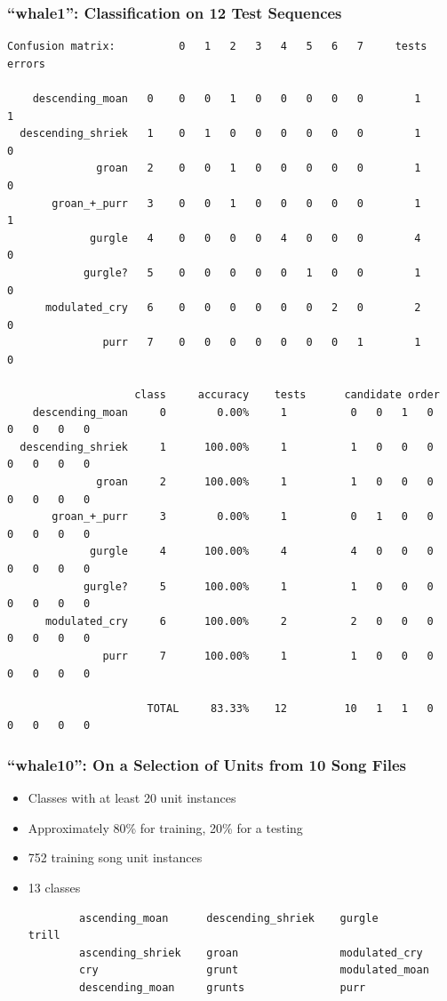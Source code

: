 \documentclass{beamer}
\begin{document}
\begin{frame}[fragile]
    \frametitle{``whale1'': Classification on 12 Test Sequences}

    \tiny{
    \begin{verbatim}
Confusion matrix:          0   1   2   3   4   5   6   7     tests   errors

    descending_moan   0    0   0   1   0   0   0   0   0        1       1
  descending_shriek   1    0   1   0   0   0   0   0   0        1       0
              groan   2    0   0   1   0   0   0   0   0        1       0
       groan_+_purr   3    0   0   1   0   0   0   0   0        1       1
             gurgle   4    0   0   0   0   4   0   0   0        4       0
            gurgle?   5    0   0   0   0   0   1   0   0        1       0
      modulated_cry   6    0   0   0   0   0   0   2   0        2       0
               purr   7    0   0   0   0   0   0   0   1        1       0

                    class     accuracy    tests      candidate order
    descending_moan     0        0.00%     1          0   0   1   0   0   0   0   0
  descending_shriek     1      100.00%     1          1   0   0   0   0   0   0   0
              groan     2      100.00%     1          1   0   0   0   0   0   0   0
       groan_+_purr     3        0.00%     1          0   1   0   0   0   0   0   0
             gurgle     4      100.00%     4          4   0   0   0   0   0   0   0
            gurgle?     5      100.00%     1          1   0   0   0   0   0   0   0
      modulated_cry     6      100.00%     2          2   0   0   0   0   0   0   0
               purr     7      100.00%     1          1   0   0   0   0   0   0   0

                      TOTAL     83.33%    12         10   1   1   0   0   0   0   0
    \end{verbatim}
    }

\end{frame}




\begin{frame}[fragile]
\frametitle{``whale10'': On a Selection of Units from 10 Song Files}

\begin{itemize}
    \item Classes with at least 20 unit instances
    \item Approximately 80\% for training, 20\% for a testing
    \item 752 training song unit instances
    \item 13 classes
        \tiny{
        \begin{verbatim}
        ascending_moan      descending_shriek    gurgle            trill
        ascending_shriek    groan                modulated_cry
        cry                 grunt                modulated_moan
        descending_moan     grunts               purr
        \end{verbatim}
        }
\end{itemize}

\end{frame}
\end{document}
